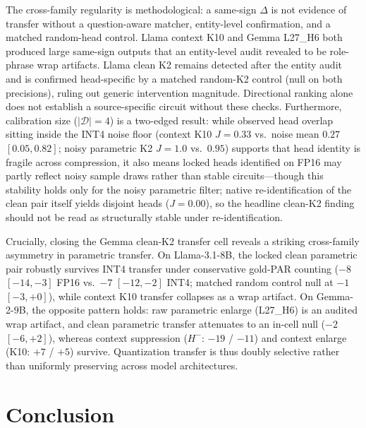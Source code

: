 \documentclass{article} %
\begin{document}
The cross-family regularity is methodological: a same-sign $\Delta$ is not evidence of transfer without a question-aware matcher, entity-level confirmation, and a matched random-head control. Llama context K10 and Gemma L27\_H6 both produced large same-sign outputs that an entity-level audit revealed to be role-phrase wrap artifacts. Llama clean K2 remains detected after the entity audit and is confirmed head-specific by a matched random-K2 control (null on both precisions), ruling out generic intervention magnitude. Directional ranking alone does not establish a source-specific circuit without these checks. Furthermore, calibration size ($|\mathcal{D}|{=}4$) is a two-edged result: while observed head overlap sitting inside the INT4 noise floor (context K10 $J{=}0.33$ vs.\ noise mean $0.27$ $[0.05, 0.82]$; noisy parametric K2 $J{=}1.0$ vs.\ $0.95$) supports that head identity is fragile across compression, it also means locked heads identified on FP16 may partly reflect noisy sample draws rather than stable circuits---though this stability holds only for the noisy parametric filter; native re-identification of the clean pair itself yields disjoint heads ($J{=}0.00$), so the headline clean-K2 finding should not be read as structurally stable under re-identification.

Crucially, closing the Gemma clean-K2 transfer cell reveals a striking cross-family asymmetry in parametric transfer. On Llama-3.1-8B, the locked clean parametric pair robustly survives INT4 transfer under conservative gold-PAR counting ($-8$ $[-14,-3]$ FP16 vs.\ $-7$ $[-12,-2]$ INT4; matched random control null at $-1$ $[-3,+0]$), while context K10 transfer collapses as a wrap artifact. On Gemma-2-9B, the opposite pattern holds: raw parametric enlarge (L27\_H6) is an audited wrap artifact, and clean parametric transfer attenuates to an in-cell null ($-2$ $[-6,+2]$), whereas context suppression ($H^{-}$: $-19$ / $-11$) and context enlarge (K10: $+7$ / $+5$) survive. Quantization transfer is thus doubly selective rather than uniformly preserving across model architectures.

\section{Conclusion}
\label{sec:conclusion}
\end{document}
